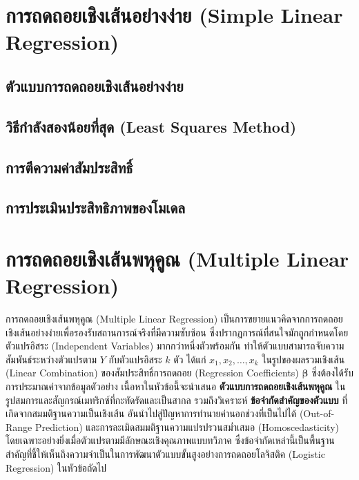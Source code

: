 \section{การถดถอยเชิงเส้นอย่างง่าย (Simple Linear Regression)}

\subsection{ตัวแบบการถดถอยเชิงเส้นอย่างง่าย}
\subsection{วิธีกำลังสองน้อยที่สุด (Least Squares Method)}
\subsection{การตีความค่าสัมประสิทธิ์}
\subsection{การประเมินประสิทธิภาพของโมเดล}




\section{การถดถอยเชิงเส้นพหุคูณ (Multiple Linear Regression)}
การถดถอยเชิงเส้นพหุคูณ (Multiple Linear Regression) เป็นการขยายแนวคิดจากการถดถอยเชิงเส้นอย่างง่ายเพื่อรองรับสถานการณ์จริงที่มีความซับซ้อน ซึ่งปรากฏการณ์ที่สนใจมักถูกกำหนดโดยตัวแปรอิสระ (Independent Variables) มากกว่าหนึ่งตัวพร้อมกัน ทำให้ตัวแบบสามารถจับความสัมพันธ์ระหว่างตัวแปรตาม $Y$ กับตัวแปรอิสระ $k$ ตัว ได้แก่ $x_1, x_2, \ldots, x_k$ ในรูปของผลรวมเชิงเส้น (Linear Combination) ของสัมประสิทธิ์การถดถอย (Regression Coefficients) $\boldsymbol{\beta}$ ซึ่งต้องได้รับการประมาณค่าจากข้อมูลตัวอย่าง เนื้อหาในหัวข้อนี้จะนำเสนอ \textbf{ตัวแบบการถดถอยเชิงเส้นพหุคูณ} ในรูปสมการและสัญกรณ์เมทริกซ์ที่กะทัดรัดและเป็นสากล รวมถึงวิเคราะห์ \textbf{ข้อจำกัดสำคัญของตัวแบบ} ที่เกิดจากสมมติฐานความเป็นเชิงเส้น อันนำไปสู่ปัญหาการทำนายค่านอกช่วงที่เป็นไปได้ (Out-of-Range Prediction) และการละเมิดสมมติฐานความแปรปรวนสม่ำเสมอ (Homoscedasticity) โดยเฉพาะอย่างยิ่งเมื่อตัวแปรตามมีลักษณะเชิงคุณภาพแบบทวิภาค ซึ่งข้อจำกัดเหล่านี้เป็นพื้นฐานสำคัญที่ชี้ให้เห็นถึงความจำเป็นในการพัฒนาตัวแบบขั้นสูงอย่างการถดถอยโลจิสติค (Logistic Regression) ในหัวข้อถัดไป


